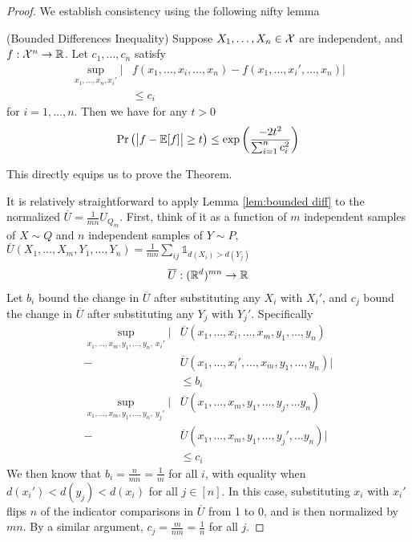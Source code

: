 \begin{proof}
We establish consistency using the following nifty lemma 
\begin{lemma}{(Bounded Differences Inequality)}
\label{lem:bounded diff}
Suppose $X_1, \dots, X_n \in \mathcal{X}$	are independent, and $f:\mathcal{X}^n \rightarrow {\mathbb R}$. Let $c_1, \dots, c_n$ satisfy 
\begin{align*}
	\sup_{x_1, \dots, x_n, x_i'} \big| &f(x_1, \dots, x_i, \dots, x_n) - f(x_1, \dots, x_i', \dots, x_n) \big| \\
	&\leq c_i
\end{align*}
for $i = 1, \dots, n$. Then we have for any $t > 0$
\begin{align}
	\Pr\big(\big| f - {\mathbb E}[f]\big| \geq t\big) \leq \exp\bigg( \frac{-2t^2}{\sum_{i=1}^n c_i^2} \bigg) 
	\label{eqn:bounded diff}
\end{align}
\end{lemma}

This directly equips us to prove the Theorem. 

It is relatively straightforward to apply Lemma \ref{lem:bounded diff} to the normalized $\overline{U} = \frac{1}{mn} U_{Q_m}$. First, think of it as a function of $m$ independent samples of $X \sim Q$ and $n$ independent samples of $Y \sim P$, $\overline{U}(X_1, \dots, X_m, Y_1, \dots, Y_n) = \frac{1}{mn} \sum_{ij} \mathds{1}_{d(X_i) > d(Y_j)}$
\begin{align*}
	\overline{U}: ({\mathbb R}^{d})^{mn} \rightarrow {\mathbb R} 
\end{align*}
Let $b_i$ bound the change in $\overline{U}$ after substituting any $X_i$ with $X_i'$, and $c_j$ bound the change in $\overline{U}$ after substituting any $Y_j$ with $Y_j'$. Specifically 
\begin{align*}
	\sup_{x_1, \dots, x_m, y_1, \dots, y_n,\  x_i'} \big| &\overline{U}(x_1, \dots, x_i, \dots, x_m, y_1, \dots, y_n) \\
	- &\overline{U}(x_1, \dots, x_i', \dots, x_m, y_1, \dots, y_n)\big| \\
	&\leq b_i \\
	\sup_{x_1, \dots, x_m, y_1, \dots, y_n,\  y_j'} \big| &\overline{U}(x_1, \dots, x_m, y_1, \dots, y_j, \dots  y_n) \\
	- &\overline{U}(x_1, \dots, x_m, y_1, \dots, y_j', \dots  y_n)\big| \\
	&\leq c_i
\end{align*}
We then know that $b_i = \frac{n}{mn} = \frac{1}{m}$ for all $i$, with equality when $d(x_i') < d(y_j) < d(x_i)$ for all $j \in [n]$. In this case, substituting $x_i$ with $x_i'$ flips $n$ of the indicator comparisons in $\overline{U}$ from 1 to 0, and is then normalized by $mn$. By a similar argument, $c_j = \frac{m}{nm} = \frac{1}{n}$ for all $j$. 


\end{proof}
